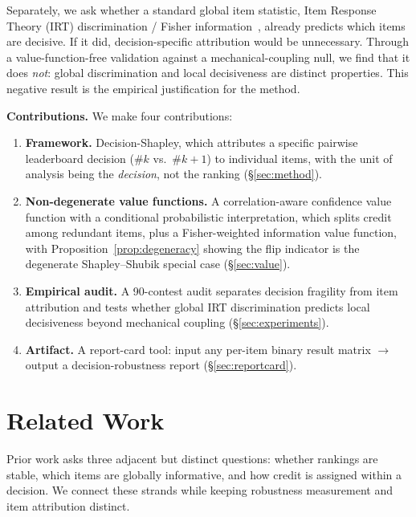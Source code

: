 \documentclass[conference]{IEEEtran}
\begin{document}
Separately, we ask whether a standard global item statistic, Item Response Theory (IRT) discrimination / Fisher information~\cite{kipnis2025metabench, polo2024tinybenchmarks}, already predicts which items are decisive.
If it did, decision-specific attribution would be unnecessary.
Through a value-function-free validation against a mechanical-coupling null, we find that it does \emph{not}: global discrimination and local decisiveness are distinct properties.
This negative result is the empirical justification for the method.

\textbf{Contributions.} We make four contributions:

\begin{enumerate}
    \item \textbf{Framework.} Decision-Shapley, which attributes a specific pairwise leaderboard decision (\#$k$ vs.\ \#$k\!+\!1$) to individual items, with the unit of analysis being the \emph{decision}, not the ranking (\S\ref{sec:method}).
    \item \textbf{Non-degenerate value functions.} A correlation-aware confidence value function with a conditional probabilistic interpretation, which splits credit among redundant items, plus a Fisher-weighted information value function, with Proposition~\ref{prop:degeneracy} showing the flip indicator is the degenerate Shapley--Shubik special case (\S\ref{sec:value}).
    \item \textbf{Empirical audit.} A 90-contest audit separates decision fragility from item attribution and tests whether global IRT discrimination predicts local decisiveness beyond mechanical coupling (\S\ref{sec:experiments}).
    \item \textbf{Artifact.} A report-card tool: input any per-item binary result matrix $\to$ output a decision-robustness report (\S\ref{sec:reportcard}).
\end{enumerate}

\section{Related Work}
\label{sec:related}

Prior work asks three adjacent but distinct questions: whether rankings are stable, which items are globally informative, and how credit is assigned within a decision.
We connect these strands while keeping robustness measurement and item attribution distinct.
\end{document}
